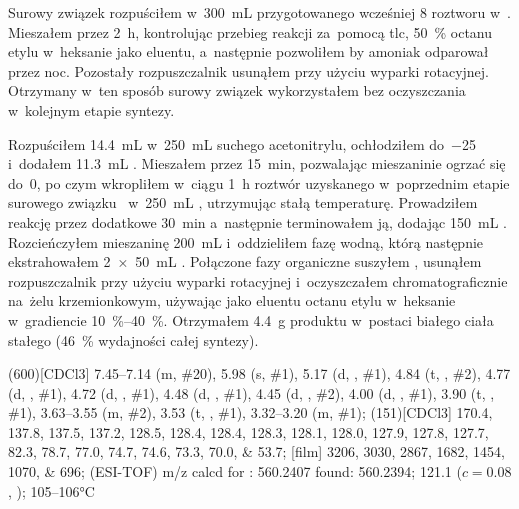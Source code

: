 Surowy związek  rozpuściłem w~\SI{300}{\mL}
  przygotowanego wcześniej \SI{8}{\Molar} roztworu  w~.
Mieszałem przez \SI{2}{\hour}, kontrolując przebieg reakcji za~pomocą \gls{tlc},
  \SI{50}{\percent} octanu etylu w~heksanie jako eluentu,
  a~następnie pozwoliłem by amoniak odparował przez noc.
Pozostały rozpuszczalnik usunąłem przy użyciu wyparki rotacyjnej.
Otrzymany w~ten sposób surowy związek  wykorzystałem bez oczyszczania
  w~kolejnym etapie syntezy.

Rozpuściłem \SI{14.4}{\mL}  w~\SI{250}{\mL} suchego acetonitrylu,
  ochłodziłem do~\SI{-25}{\degC} i~dodałem \SI{11.3}{\mL} .
Mieszałem przez \SI{15}{\minute}, pozwalając mieszaninie ogrzać się do~\SI{0}{\degC},
  po czym wkropliłem w~ciągu \SI{1}{\hour} roztwór uzyskanego w~poprzednim etapie surowego
  związku~ w~\SI{250}{\mL} , utrzymując stałą temperaturę.
Prowadziłem reakcję przez dodatkowe \SI{30}{\minute} a~następnie terminowałem ją, dodając
  \SI{150}{\mL} .
Rozcieńczyłem mieszaninę \SI{200}{\mL}  i~oddzieliłem fazę wodną, którą następnie
  ekstrahowałem \SI[product-units = single]{2 x 50}{\mL} .
Połączone fazy organiczne suszyłem , usunąłem rozpuszczalnik przy użyciu wyparki
  rotacyjnej i~oczyszczałem chromatograficznie na~żelu krzemionkowym,
  używając jako eluentu octanu etylu w~heksanie w~gradiencie \SIrange{10}{40}{\percent}.
Otrzymałem \SI{4.4}{\gram} produktu w~postaci białego ciała stałego
  (\SI{46}{\percent} wydajności całej syntezy).

\begin{fullexp}
  \NMR(600)[CDCl3] \numrange{7.45}{7.14} (m, \#{20}), \num{5.98} (s, \#{1}), \num{5.17} (d, , \#{1}), \num{4.84} (t, , \#{2}), \num{4.77} (d, , \#{1}), \num{4.72} (d, , \#{1}), \num{4.48} (d, , \#{1}), \num{4.45} (d, , \#{2}), \num{4.00} (d, , \#{1}), \num{3.90} (t, , \#{1}), \numrange{3.63}{3.55} (m, \#{2}), \num{3.53} (t, , \#{1}), \numrange{3.32}{3.20} (m, \#{1}); 
  (151)[CDCl3] \numlist{170.4; 137.8; 137.5; 137.2; 128.5; 128.4; 128.4; 128.3; 128.1; 128.0; 127.9; 127.8; 127.7; 82.3; 78.7; 77.0; 74.7; 74.6; 73.3; 70.0; 53.7}; 
  [film] \numlist{3206; 3030; 2867; 1682; 1454; 1070; 696}; 
   (ESI-TOF) m/z calcd for : \num{560.2407} found: \num{560.2394};
  \data{[$\alpha^{23}_D$]~$=$} \num{121.1} ($c = 0.08$, ); 
   \numrange{105}{106}\si{\celsius}
\end{fullexp}

